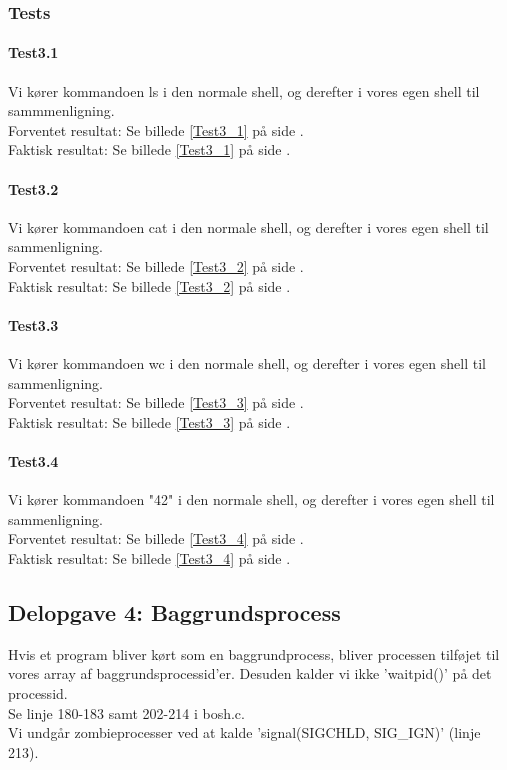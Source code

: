 \subsubsection{Tests}
\paragraph{Test3.1}
Vi kører kommandoen ls i den normale shell, og derefter i vores egen shell til sammmenligning.
\\Forventet resultat: Se billede \ref{Test3_1} på side \pageref{Test3_1}.
\\Faktisk resultat: Se billede \ref{Test3_1} på side \pageref{Test3_1}.

\paragraph{Test3.2}
Vi kører kommandoen cat i den normale shell, og derefter i vores egen shell til sammenligning.
\\Forventet resultat: Se billede \ref{Test3_2} på side \pageref{Test3_2}.
\\Faktisk resultat: Se billede \ref{Test3_2} på side \pageref{Test3_2}.

\paragraph{Test3.3}
Vi kører kommandoen wc i den normale shell, og derefter i vores egen shell til sammenligning.
\\Forventet resultat: Se billede \ref{Test3_3} på side \pageref{Test3_3}.
\\Faktisk resultat: Se billede \ref{Test3_3} på side \pageref{Test3_3}.

\paragraph{Test3.4}
Vi kører kommandoen "42" i den normale shell, og derefter i vores egen shell til sammenligning.
\\Forventet resultat: Se billede \ref{Test3_4} på side \pageref{Test3_4}.
\\Faktisk resultat: Se billede \ref{Test3_4} på side \pageref{Test3_4}.

\subsection{Delopgave 4: Baggrundsprocess}
\label{D4}
Hvis et program bliver kørt som en baggrundprocess, bliver processen tilføjet til vores array af baggrundsprocessid'er. Desuden kalder vi ikke 'waitpid()' på det processid. 
\\Se linje 180-183 samt 202-214  i bosh.c.
\\Vi undgår zombieprocesser ved at kalde 'signal(SIGCHLD, SIG\_IGN)' (linje 213).
